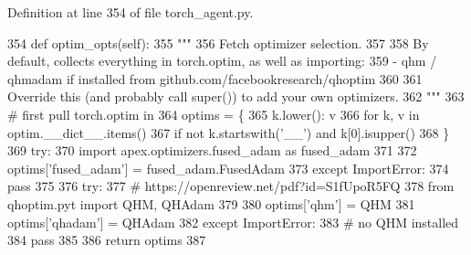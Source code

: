 Definition at line 354 of file torch\+\_\+agent.\+py.


\begin{DoxyCode}
354     \textcolor{keyword}{def }optim\_opts(self):
355         \textcolor{stringliteral}{"""}
356 \textcolor{stringliteral}{        Fetch optimizer selection.}
357 \textcolor{stringliteral}{}
358 \textcolor{stringliteral}{        By default, collects everything in torch.optim, as well as importing:}
359 \textcolor{stringliteral}{        - qhm / qhmadam if installed from github.com/facebookresearch/qhoptim}
360 \textcolor{stringliteral}{}
361 \textcolor{stringliteral}{        Override this (and probably call super()) to add your own optimizers.}
362 \textcolor{stringliteral}{        """}
363         \textcolor{comment}{# first pull torch.optim in}
364         optims = \{
365             k.lower(): v
366             \textcolor{keywordflow}{for} k, v \textcolor{keywordflow}{in} optim.\_\_dict\_\_.items()
367             \textcolor{keywordflow}{if} \textcolor{keywordflow}{not} k.startswith(\textcolor{stringliteral}{'\_\_'}) \textcolor{keywordflow}{and} k[0].isupper()
368         \}
369         \textcolor{keywordflow}{try}:
370             \textcolor{keyword}{import} apex.optimizers.fused\_adam \textcolor{keyword}{as} fused\_adam
371 
372             optims[\textcolor{stringliteral}{'fused\_adam'}] = fused\_adam.FusedAdam
373         \textcolor{keywordflow}{except} ImportError:
374             \textcolor{keywordflow}{pass}
375 
376         \textcolor{keywordflow}{try}:
377             \textcolor{comment}{# https://openreview.net/pdf?id=S1fUpoR5FQ}
378             \textcolor{keyword}{from} qhoptim.pyt \textcolor{keyword}{import} QHM, QHAdam
379 
380             optims[\textcolor{stringliteral}{'qhm'}] = QHM
381             optims[\textcolor{stringliteral}{'qhadam'}] = QHAdam
382         \textcolor{keywordflow}{except} ImportError:
383             \textcolor{comment}{# no QHM installed}
384             \textcolor{keywordflow}{pass}
385 
386         \textcolor{keywordflow}{return} optims
387 
\end{DoxyCode}
\mbox{\label{classparlai_1_1core_1_1torch__agent_1_1TorchAgent_a02beaaedfa30463f9d0a97ea590b516f}} 
